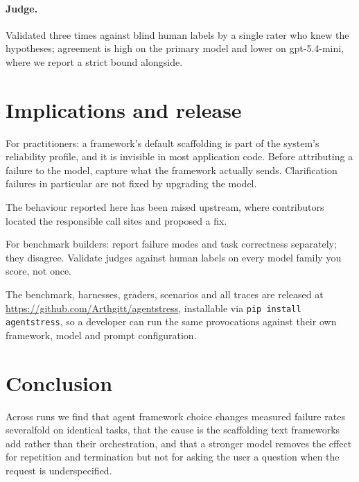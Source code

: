 \documentclass[10pt,twocolumn]{article}
\begin{document}
\paragraph{Judge.} Validated three times against blind human labels by a single
rater who knew the hypotheses; agreement is high on the primary model and lower
on gpt-5.4-mini, where we report a strict bound alongside.

\section{Implications and release}

For practitioners: a framework's default scaffolding is part of the system's
reliability profile, and it is invisible in most application code. Before
attributing a failure to the model, capture what the framework actually sends.
Clarification failures in particular are not fixed by upgrading the model.

The behaviour reported here has been raised upstream, where contributors
located the responsible call sites and proposed a fix.

For benchmark builders: report failure modes and task correctness separately;
they disagree. Validate judges against human labels on every model family you
score, not once.

The benchmark, harnesses, graders, scenarios and all traces are released at
\url{https://github.com/Arthgitt/agentstress}, installable via \texttt{pip install agentstress}, so a developer can run the
same provocations against their own framework, model and prompt configuration.

\section{Conclusion}

Across \nRunsTotal{} runs we find that agent framework choice changes measured
failure rates severalfold on identical tasks, that the cause is the scaffolding
text frameworks add rather than their orchestration, and that a stronger model
removes the effect for repetition and termination but not for asking the user a
question when the request is underspecified.
\end{document}
